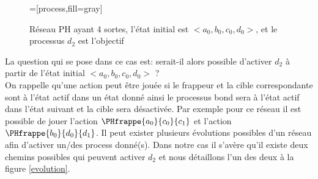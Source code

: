 \begin{figure}[ht]
\centering
{}=[process,fill=gray]
\caption{Réseau PH ayant 4 sortes, l'état initial est $<a_0,b_0,c_0,d_0>$, et le processus $d_2$ est l'objectif }
\label{fig:atteingnabiliteExp}
\end{figure}

La question qui se pose dans ce cas est: serait-il alors possible d'activer $d_2$ à partir de l'état initial $<a_0,b_0,c_0,d_0>$ ? \\
On rappelle qu'une action peut être jouée si le frappeur et la cible correspondante sont à l'état actif dans un état donné ainsi le processus bond sera à l'état actif dans l'état suivant et la cible sera désactivée. Par exemple pour ce réseau il est possible de jouer l'action $\PHfrappe{a_0}{c_0}{c_1}$ et l'action $\PHfrappe{b_0}{d_0}{d_1}$. Il peut exister plusieurs évolutions possibles d'un réseau afin d'activer un/des process donné(s). Dans notre cas 
il s'avère qu'il existe deux chemins possibles qui peuvent activer $d_2$ et nous détaillons l'un des deux à la figure \ref{evolution}.

